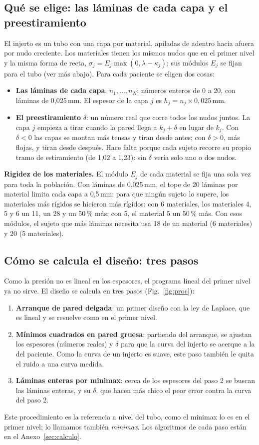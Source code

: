 \subsection{Qué se elige: las láminas de cada capa y el preestiramiento}
El injerto es un tubo con una capa por material, apiladas de adentro hacia afuera por nudo creciente. Los materiales tienen los mismos nudos que en el primer nivel y la misma forma de recta, $\sigma_j=E_j\max(0,\lambda-\kappa_j)$; sus módulos $E_j$ se fijan para el tubo (ver más abajo). Para cada paciente se eligen dos cosas:
\begin{itemize}
\item \textbf{Las láminas de cada capa}, $n_1,\dots,n_N$: números enteros de 0 a 20, con láminas de 0,025\,mm. El espesor de la capa $j$ es $h_j=n_j\times0{,}025$\,mm.
\item \textbf{El preestiramiento} $\delta$: un número real que corre todos los nudos juntos. La capa $j$ empieza a tirar cuando la pared llega a $k_j+\delta$ en lugar de $k_j$. Con $\delta<0$ las capas se montan más tensas y tiran desde antes; con $\delta>0$, más flojas, y tiran desde después. Hace falta porque cada sujeto recorre su propio tramo de estiramiento (de 1,02 a 1,23): sin $\delta$ vería solo uno o dos nudos.
\end{itemize}
\textbf{Rigidez de los materiales.} El módulo $E_j$ de cada material se fija una sola vez para toda la población. Con láminas de 0,025\,mm, el tope de 20 láminas por material limita cada capa a 0,5\,mm; para que ningún sujeto lo supere, los materiales más rígidos se hicieron más rígidos: con 6 materiales, los materiales 4, 5 y 6 un 11, un 28 y un 50\,\% más; con 5, el material 5 un 50\,\% más. Con esos módulos, el sujeto que más láminas necesita usa 18 de un material (6 materiales) y 20 (5 materiales).

\subsection{Cómo se calcula el diseño: tres pasos}
Como la presión no es lineal en los espesores, el programa lineal del primer nivel ya no sirve. El diseño se calcula en tres pasos (Fig.~\ref{fig:proc}):
\begin{enumerate}
\item \textbf{Arranque de pared delgada}: un primer diseño con la ley de Laplace, que es lineal y se resuelve como en el primer nivel.
\item \textbf{Mínimos cuadrados en pared gruesa}: partiendo del arranque, se ajustan los espesores (números reales) y $\delta$ para que la curva del injerto se acerque a la del paciente. Como la curva de un injerto es suave, este paso también le quita el ruido a una curva medida.
\item \textbf{Láminas enteras por minimax}: cerca de los espesores del paso 2 se buscan las láminas enteras, y su $\delta$, que hacen más chico el peor error contra la curva del paso 2.
\end{enumerate}
Este procedimiento es la referencia a nivel del tubo, como el minimax lo es en el primer nivel; lo llamamos también \emph{minimax}. Los algoritmos de cada paso están en el Anexo~\ref{sec:calculo}.

